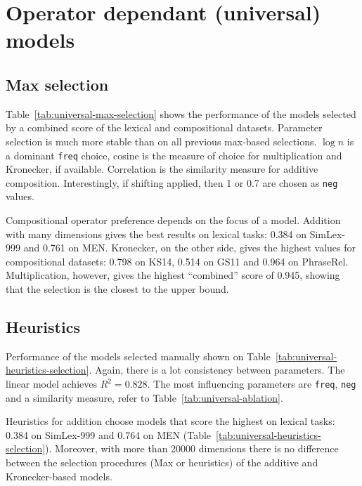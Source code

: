 \section{Operator dependant (universal) models}
\label{sec:model-selection}

\subsection{Max selection}
\label{sec:max-selection-universal}

Table~\ref{tab:universal-max-selection} shows the performance of the models selected by a combined score of the lexical and compositional datasets. Parameter selection is much more stable than on all previous max-based selections. $\log n$ is a dominant \texttt{freq} choice, cosine is the measure of choice for multiplication and Kronecker, if available. Correlation is the similarity measure for additive composition. Interestingly, if shifting applied, then 1 or 0.7 are chosen as \texttt{neg} values.

Compositional operator preference depends on the focus of a model.
Addition with many dimensions gives the best results on lexical tasks: 0.384 on SimLex-999 and 0.761 on MEN. Kronecker, on the other side, gives the highest values for compositional datasets: 0.798 on KS14, 0.514 on GS11 and 0.964 on PhraseRel. Multiplication, however, gives the highest ``combined'' score of 0.945, showing that the selection is the closest to the upper bound.

\subsection{Heuristics}
\label{sec:heuristics-universal}



Performance of the models selected manually shown on Table~\ref{tab:universal-heuristics-selection}. Again, there is a lot consistency between parameters. The linear model achieves $R^2 = 0.828$. The most influencing parameters are \texttt{freq}, \texttt{neg} and a similarity measure, refer to Table~\ref{tab:universal-ablation}.

Heuristics for addition choose models that score the highest on lexical tasks: 0.384 on SimLex-999 and 0.764 on MEN (Table~\ref{tab:universal-heuristics-selection}). Moreover, with more than 20000 dimensions there is no difference between the selection procedures (Max or heuristics) of the additive and Kronecker-based models.

